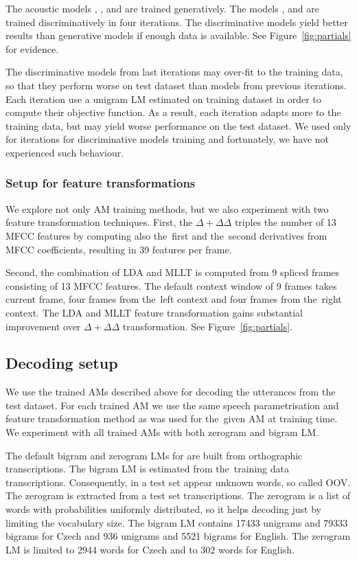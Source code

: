The acoustic models , ,  and  are trained generatively.
The models ,  and  are trained discriminatively in four iterations.
The discriminative models yield better results than generative models if enough data is available. 
See Figure~\ref{fig:partials} for evidence.

The discriminative models from last iterations may over-fit to the training data, so that they perform worse on test dataset than models from previous iterations. 
Each iteration use a unigram \ac{LM} estimated on training dataset in order to compute their objective function.
As a result, each iteration adapts more to the training data, but may yield worse performance on the test dataset.
We used only for iterations for discriminative models training and fortunately, we have not experienced such behaviour.

\subsubsection*{Setup for feature transformations}
We explore not only \ac{AM} training methods, but we also experiment with two feature transformation techniques.
First, the $\Delta + \Delta\Delta$ triples the number of 13 \ac{MFCC} features by computing also the~first and the~second derivatives from \ac{MFCC} coefficients, resulting in 39 features per frame.

Second, the combination of \ac{LDA} and \ac{MLLT} is computed from 9 spliced frames consisting of 13 \ac{MFCC} features. 
The default context window of 9 frames takes current frame, four frames from the~left context and four frames from the~right context.
The \ac{LDA} and \ac{MLLT} feature transformation gains substantial improvement over $\Delta+\Delta\Delta$ transformation.
See Figure~\ref{fig:partials}.

\subsection*{Decoding setup}
We use the trained \acp{AM} described above for decoding the utterances from the test dataset.
For each trained \ac{AM} we use the same speech parametrisation and feature transformation method as was used for the~given \ac{AM} at training time.
We experiment with all trained \acp{AM} with both zerogram and bigram \ac{LM}.

The default bigram and zerogram \acp{LM} for are built from orthographic transcriptions.
The bigram \ac{LM} is estimated from the~training data transcriptions. 
Consequently, in a test set appear unknown words, so called \acl{OOV}.
The zerogram is extracted from a test set transcriptions.
The zerogram is a list of words with probabilities uniformly distributed, so it helps decoding just by limiting the vocabulary size.
The bigram \ac{LM} contains 17433 unigrams and 79333 bigrams for Czech and 936 unigrams and 5521 bigrams for English. 
The zerogram \ac{LM} is limited to 2944 words for Czech and to 302 words for English.

